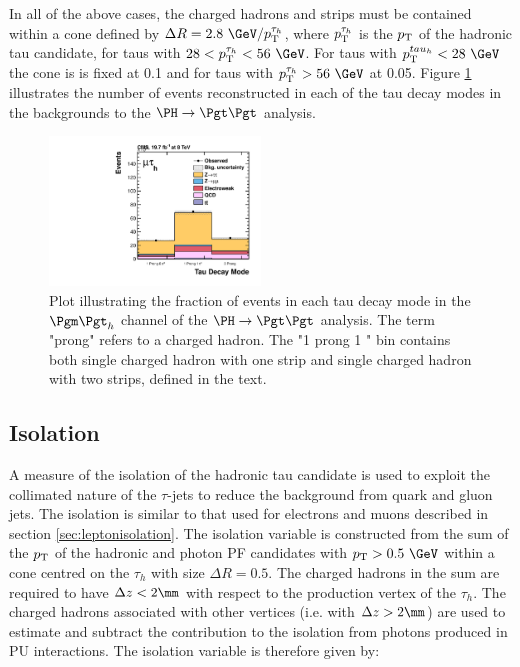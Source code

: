 In all of the above cases, the charged hadrons and strips must be contained
within a cone defined by $\Delta R=2.8~\GeV/\pt^{\tau_{h}}$, where
$p_{\mathrm{T}}^{\tau_{h}}$ is the $p_{\mathrm{T}}$ of the hadronic tau candidate, for taus with $28 <
\pt^{\tau_{h}} < 56~\GeV$. For taus with $\pt^{tau_{h}} < 28~\GeV$ the cone is
is fixed at 0.1 and for taus with $\pt^{\tau_{h}} > 56~\GeV$ at 0.05. 
Figure \ref{fig:taudecaymode} illustrates the number of events reconstructed in
each of the tau decay modes in the backgrounds to the $\PH \to \Pgt\Pgt$ analysis.

\begin{figure}
\begin{center}
    \includegraphics[width=0.5\textwidth]
      {plots/reco/tau_decay_mode_inclusive_mt_2012.pdf}
\end{center}
\caption{Plot illustrating the fraction of events in each tau decay mode in the
$\mutau$ channel of the $\PH\to\Pgt\Pgt$ analysis. The term "prong" refers to a
charged hadron. The "1 prong 1 \Pgpz" bin contains both single charged hadron
with one strip and single charged hadron with two strips, defined in the text.
}
\label{fig:taudecaymode}
\end{figure}

\subsection{Isolation}
\label{sec:tauisolation}

A measure of the isolation of the hadronic tau candidate is used to exploit the
collimated nature of the $\tau$-jets to reduce the background from quark and gluon
jets. The isolation is similar to that used for electrons and muons described in
section \ref{sec:leptonisolation}. The isolation variable is constructed from 
the sum of the $p_{\mathrm{T}}$ of the
hadronic and photon \ac{PF} candidates with $\pt > 0.5~\GeV$ within a cone centred on 
the $\tau_{h}$ with size $\Delta R = 0.5$. The charged hadrons in the sum are
required to have $\Delta z < 2\mm$ with respect to the production vertex of the
$\tau_{h}$. The charged hadrons associated with other vertices (i.e. with
$\Delta z > 2\mm$) are used to
estimate and subtract the contribution to the isolation from photons produced in
\ac{PU} interactions. The isolation variable is therefore given by:

